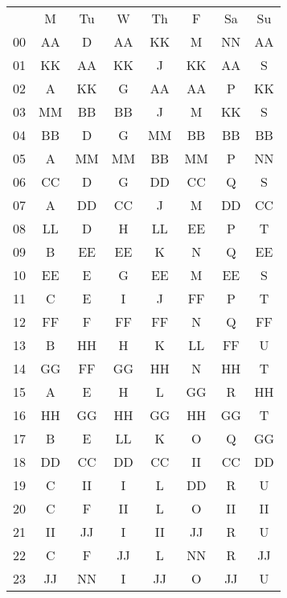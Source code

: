 \documentclass{article}
\begin{document}
\begin{center}
  \begin{tabular}{c|c|c|c|c|c|c|c|}
    \multicolumn{1}{c}{} & 
    \multicolumn{1}{c}{M} & 
    \multicolumn{1}{c}{Tu} & 
    \multicolumn{1}{c}{W} & 
    \multicolumn{1}{c}{Th} & 
    \multicolumn{1}{c}{F} & 
    \multicolumn{1}{c}{Sa} & 
    \multicolumn{1}{c}{Su} \\ \cline{2-8}
 00 & AA & D  & AA & KK & M  & NN & AA \\ \cline{2-8}
 01 & KK & AA & KK & J  & KK & AA & S  \\ \cline{2-8}
 02 &  A & KK & G  & AA & AA & P  & KK \\ \cline{2-8}
 03 & MM & BB & BB & J  & M  & KK & S  \\ \cline{2-8}
 04 & BB & D  & G  & MM & BB & BB & BB \\ \cline{2-8}
 05 &  A & MM & MM & BB & MM & P  & NN \\ \cline{2-8}
 06 & CC & D  & G  & DD & CC & Q  & S  \\ \cline{2-8}
 07 &  A & DD & CC & J  & M  & DD & CC \\ \cline{2-8}
 08 & LL & D  & H  & LL & EE & P  & T  \\ \cline{2-8}
 09 &  B & EE & EE & K  & N  & Q  & EE \\ \cline{2-8}
 10 & EE & E  & G  & EE & M  & EE & S  \\ \cline{2-8}
 11 &  C & E  & I  & J  & FF & P  & T  \\ \cline{2-8}
 12 & FF & F  & FF & FF & N  & Q  & FF \\ \cline{2-8}
 13 &  B & HH & H  & K  & LL & FF & U  \\ \cline{2-8}
 14 & GG & FF & GG & HH & N  & HH & T  \\ \cline{2-8}
 15 &  A & E  & H  & L  & GG & R  & HH \\ \cline{2-8}
 16 & HH & GG & HH & GG & HH & GG & T  \\ \cline{2-8}
 17 &  B & E  & LL & K  & O  & Q  & GG \\ \cline{2-8}
 18 & DD & CC & DD & CC & II & CC & DD \\ \cline{2-8}
 19 &  C & II & I  & L  & DD & R  & U  \\ \cline{2-8}
 20 &  C & F  & II & L  & O  & II & II \\ \cline{2-8}
 21 & II & JJ & I  & II & JJ & R  & U  \\ \cline{2-8}
 22 &  C & F  & JJ & L  & NN & R  & JJ \\ \cline{2-8}
 23 & JJ & NN & I  & JJ & O  & JJ & U  \\ \cline{2-8}
\end{tabular}
\end{center}
\end{document}
